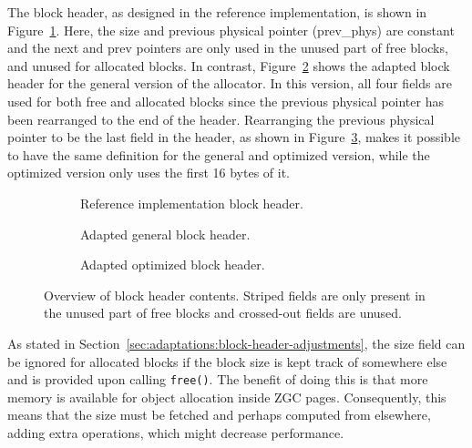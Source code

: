 The block header, as designed in the reference implementation, is shown in Figure~\ref{fig:blockheader_adap_reference}. Here, the size and previous physical pointer (prev\_phys) are constant and the next and prev pointers are only used in the unused part of free blocks, and unused for allocated blocks. In contrast, Figure~\ref{fig:blockheader_adap_general} shows the adapted block header for the general version of the allocator. In this version, all four fields are used for both free and allocated blocks since the previous physical pointer has been rearranged to the end of the header. Rearranging the previous physical pointer to be the last field in the header, as shown in Figure~\ref{fig:blockheader_adap_optimized}, makes it possible to have the same definition for the general and optimized version, while the optimized version only uses the first 16 bytes of it.

\begin{figure}[h]
    \centering
    \begin{subfigure}[b]{0.3\textwidth}
        \centering
        
        \caption{Reference implementation block header.}
        \label{fig:blockheader_adap_reference}
    \end{subfigure}%
    \hfill
    \begin{subfigure}[b]{0.3\textwidth}
        \centering
        
        \caption{Adapted general block header.}
        \label{fig:blockheader_adap_general}
    \end{subfigure}%
    \hfill
    \begin{subfigure}[b]{0.3\textwidth}
        \centering
        
        \caption{Adapted optimized block header.}
        \label{fig:blockheader_adap_optimized}
    \end{subfigure}
    \caption{Overview of block header contents. Striped fields are only present in the unused part of free blocks and crossed-out fields are unused.}
    \label{fig:blockheader_adaptations}
\end{figure}

As stated in Section~\ref{sec:adaptations:block-header-adjustments}, the size field can be ignored for allocated blocks if the block size is kept track of somewhere else and is provided upon calling \texttt{free()}. The benefit of doing this is that more memory is available for object allocation inside ZGC pages. Consequently, this means that the size must be fetched and perhaps computed from elsewhere, adding extra operations, which might decrease performance. 

